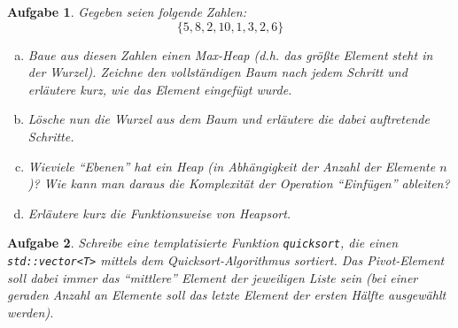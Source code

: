 \documentclass[a4paper,12pt,parskip=full]{scrartcl}
\theoremstyle{exercise}
\newtheorem{exercise}{Aufgabe}
\begin{document}
\begin{exercise}
Gegeben seien folgende Zahlen:
$$ \{ 5, 8, 2, 10, 1, 3, 2, 6 \} $$
\begin{enumerate}[a)]
\item Baue aus diesen Zahlen einen Max-Heap (d.h. das größte Element
  steht in der Wurzel). Zeichne den vollständigen Baum nach jedem
  Schritt und erläutere kurz, wie das Element eingefügt wurde.
\item Lösche nun die Wurzel aus dem Baum und erläutere die dabei
  auftretende Schritte.
\item Wieviele ``Ebenen'' hat ein Heap (in Abhängigkeit der Anzahl der
  Elemente $n$)? Wie kann man daraus die Komplexität der Operation
  ``Einfügen'' ableiten?
\item Erläutere kurz die Funktionsweise von Heapsort.
\end{enumerate}
\end{exercise}

\begin{exercise}
Schreibe eine templatisierte Funktion \texttt{quicksort},
die einen \lstinline{std::vector<T>} mittels dem Quicksort-Algorithmus
sortiert. Das Pivot-Element soll dabei immer das ``mittlere'' Element
der jeweiligen Liste sein (bei einer geraden Anzahl an Elemente soll
das letzte Element der ersten Hälfte ausgewählt werden).
\end{exercise}
\end{document}
